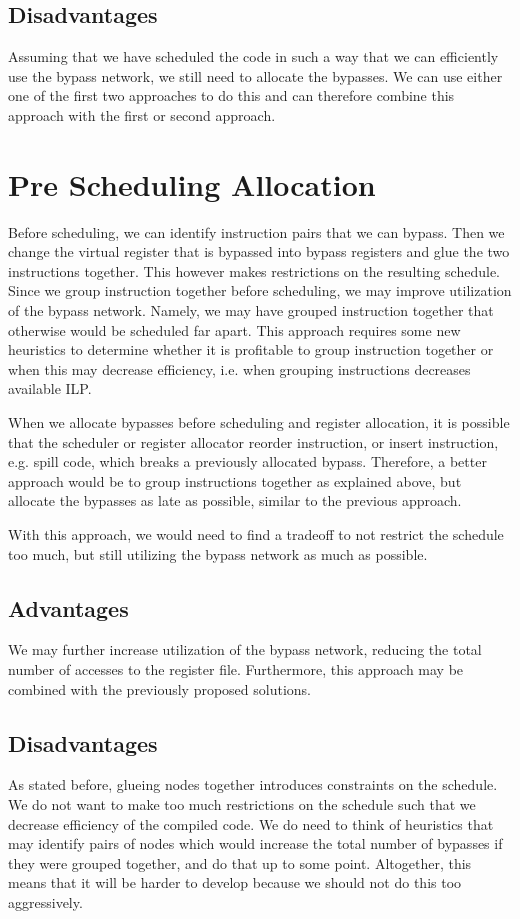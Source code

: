\subsection{Disadvantages}
Assuming that we have scheduled the code in such a way that we can efficiently use the bypass network, we still need to allocate the bypasses. We can use either one of the first two approaches to do this and can therefore combine this approach with the first or second approach.

\section{Pre Scheduling Allocation}\label{sec:pre_scheduling}
Before scheduling, we can identify instruction pairs that we can bypass. Then we change the virtual register that is bypassed into bypass registers and glue the two instructions together. This however makes restrictions on the resulting schedule. Since we group instruction together before scheduling, we may improve utilization of the bypass network. Namely, we may have grouped instruction together that otherwise would be scheduled far apart. This approach requires some new heuristics to determine whether it is profitable to group instruction together or when this may decrease efficiency, i.e. when grouping instructions decreases available ILP. 

When we allocate bypasses before scheduling and register allocation, it is possible that the scheduler or register allocator reorder instruction, or insert instruction, e.g. spill code, which breaks a previously allocated bypass. Therefore, a better approach would be to group instructions together as explained above, but allocate the bypasses as late as possible, similar to the previous approach.

With this approach, we would need to find a tradeoff to not restrict the schedule too much, but still utilizing the bypass network as much as possible.   

\subsection{Advantages}
We may further increase utilization of the bypass network, reducing the total number of accesses to the register file. Furthermore, this approach may be combined with the previously proposed solutions. 

\subsection{Disadvantages}
As stated before, glueing nodes together introduces constraints on the schedule. We do not want to make too much restrictions on the schedule such that we decrease efficiency of the compiled code. We do need to think of heuristics that may identify pairs of nodes which would increase the total number of bypasses if they were grouped together, and do that up to some point. Altogether, this means that it will be harder to develop because we should not do this too aggressively.

